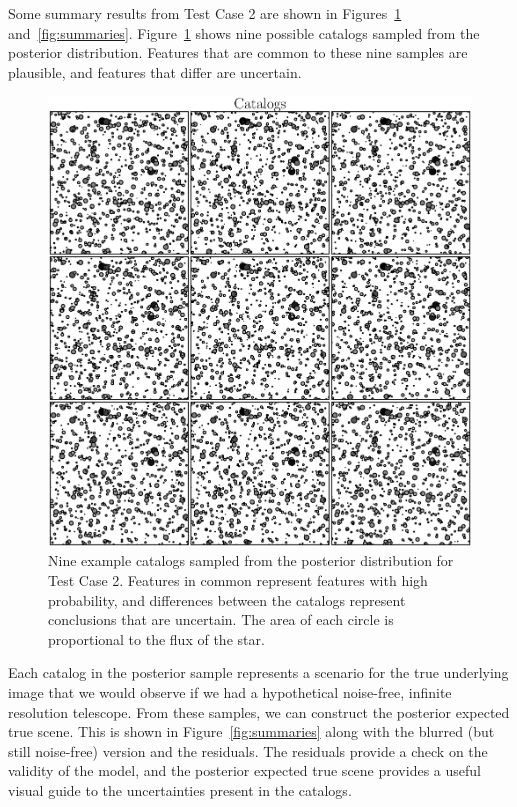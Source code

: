 \documentclass[12pt, preprint]{aastex}
\begin{document}
Some summary results from Test Case 2 are shown in Figures~\ref{fig:catalogs}
and~\ref{fig:summaries}. Figure~\ref{fig:catalogs} shows nine possible catalogs
sampled from the posterior
distribution. Features that are common to these nine samples are plausible, and
features that differ are uncertain.

\begin{figure}[ht!]
\begin{center}
\includegraphics[scale=0.6]{Figures/catalogs.eps}
\end{center}
\caption{Nine example catalogs sampled from the posterior distribution for
Test Case 2. Features in common represent features with high probability,
and differences between the catalogs represent conclusions that are uncertain.
The area of each circle is proportional to the flux of the star.\label{fig:catalogs}}
\end{figure}

Each catalog in the posterior sample represents a scenario for the true
underlying image that we would observe if we had a hypothetical noise-free,
infinite resolution telescope. From these samples, we can construct the
posterior expected true scene. This is shown in Figure~\ref{fig:summaries} along
with the blurred (but still noise-free) version and the residuals. The residuals
provide a check on the validity of the model, and the posterior expected true
scene provides a useful visual guide to the uncertainties present in the catalogs.
\end{document}
